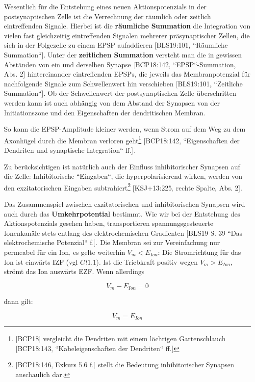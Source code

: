 {{Wesentlich für die Entstehung eines neuen Aktionspotenzials in der postsynaptischen Zelle ist die Verrechnung der räumlich oder zeitlich eintreffenden Signale. 
Hierbei ist die \textbf{räumliche Summation} die Integration von vielen fast gleichzeitig eintreffenden Signalen mehrerer präsynaptischer Zellen, die sich in der Folgezelle zu einem EPSP aufaddieren [BLS19:101, ``Räumliche Summation``]. 
Unter der \textbf{zeitlichen Summation} versteht man die in gewissen Abständen von ein und derselben Synapse [BCP18:142, ``EPSP``-Summation, Abs. 2] hintereinander eintreffenden EPSPs, die jeweils  das Membranpotenzial für nachfolgende Signale zum Schwellenwert hin verschieben [BLS19:101, ``Zeitliche Summation``]. 
Ob der Schwellenwert der postsynaptischen Zelle überschritten werden kann ist auch abhängig von dem Abstand der Synapsen von der Initiationszone und den Eigenschaften der dendritischen Membran.

So kann die EPSP-Amplitude kleiner werden, wenn Strom auf dem Weg zu dem Axonhügel durch die Membran verloren geht\footnote{
 [BCP18] vergleicht die Dendriten mit einem löchrigen Gartenschlauch [BCP18:143, ``Kabeleigenschaften der Dendriten`` ff.]
} [BCP18:142, ``Eigenschaften der Dendriten und synaptische Integration`` ff.].

Zu berücksichtigen ist natürlich auch der Einfluss inhibitorischer Synapsen auf die Zelle: Inhibitorische ``Eingaben``, die hyperpolarisierend wirken, werden von den exzitatorischen Eingaben subtrahiert\footnote{
 [BCP18:146, Exkurs 5.6 f.] stellt die Bedeutung inhibitorischer Synapsen anschaulich dar.
} [KSJ+13:225, rechte Spalte, Abs. 2].


Das Zusammenspiel zwischen exzitatorischen und inhibitorischen Synapsen wird auch durch das \textbf{Umkehrpotential} bestimmt. 
Wie wir bei der Entstehung des Aktionspotenzials gesehen haben, transportieren spannungsgesteuerte Ionenkanäle stets entlang des elektrochemischen Gradienten [BLS19 S. 39 ``Das elektrochemische Potenzial`` f.]. 
Die Membran sei zur Vereinfachung nur permeabel für ein Ion, es gelte weiterhin $V_m < E_{Ion}$: Die Stromrichtung für das Ion ist einwärts IZF (vgl $Gl1.1$). Ist die Triebkraft positiv wegen $V_m > E_{Ion}$, strömt das Ion auswärts EZF. Wenn allerdings

\begin{equation}
V_m - E_{Ion} = 0
\end{equation}

dann gilt:

\begin{equation}
V_m = E_{Ion}
\end{equation}

}}

